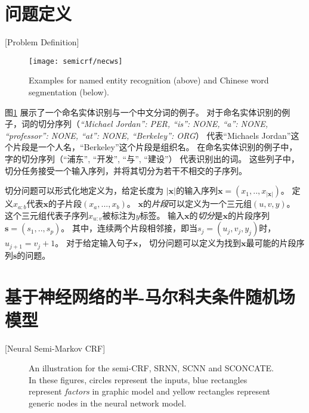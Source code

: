
\section{问题定义}[Problem Definition]
\begin{figure}[t]
	\centering
	\texttt{[image: semicrf/necws]}
	\caption{Examples for named entity recognition (above) and Chinese word segmentation (below).}
	\label{fig:semicrf:ne-and-cws}
\end{figure}

图\ref{fig:semicrf:ne-and-cws} 
展示了一个命名实体识别与一个中文分词的例子。
对于命名实体识别的例子，词的切分序列（\textit{``Michael Jordan'': PER, 
	``is'': NONE, ``a'': NONE, ``professor'': NONE, ``at'': NONE, ``Berkeley'': ORG}）
代表``Michaels Jordan''这个片段是一个人名，``Berkeley''这个片段是组织名。
在命名实体识别的例子中，
字的切分序列（``浦东'', ``开发'', ``与'', ``建设''）
代表识别出的词。
这些列子中，切分任务接受一个输入序列，并将其切分为若干不相交的子序列。

切分问题可以形式化地定义为，给定长度为
$|\mathbf{x}|$的输入序列$\mathbf{x}=( x_1, .., x_{|\mathbf{x}|} )$。
定义$x_{a:b}$代表$\mathbf{x}$的子片段$(x_a,...,x_b)$。
$\mathbf{x}$的\textit{片段}可以定义为一个三元组$(u, v, y)$。
这个三元组代表子序列$x_{u:v}$被标注为$y$标签。
输入$\mathbf{x}$的\textit{切分}是$\mathbf{x}$的片段序列$\mathbf{s} = (s_1,..,s_p)$。
其中，连续两个片段相邻接，即当$s_j=(u_j,v_j,y_j)$时，$u_{j+1}=v_j+1$。
对于给定输入句子$\mathbf{x}$，
切分问题可以定义为找到$\mathbf{x}$最可能的片段序列$\mathbf{s}$的问题。

\section{基于神经网络的半-马尔科夫条件随机场模型}[Neural Semi-Markov CRF]
\begin{figure}[t]
	\begin{minipage}{\textwidth}
		\subfigure{\label{fig:semicrf:std}}\addtocounter{subfigure}{-1}
		\subfigure{\label{fig:semicrf:srnn}}\addtocounter{subfigure}{-1}
	\end{minipage}
	\begin{minipage}{\textwidth}
		\subfigure{\label{fig:semicrf:scnn}}\addtocounter{subfigure}{-1}		
		\subfigure{\label{fig:semicrf:sconcate}}\addtocounter{subfigure}{-1}		
	\end{minipage}
	\caption{An illustration for the semi-CRF, SRNN, SCNN and SCONCATE.
		In these figures, circles represent the inputs, blue rectangles represent {\it factors} in graphic model and yellow rectangles represent generic nodes in the neural network model.}
	\label{fig:semi-crf-vs-srnn}
\end{figure}

